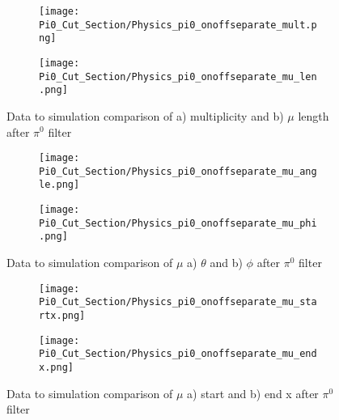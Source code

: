 \begin{figure}[h!]
\centering
  \begin{subfigure}[t]{0.3\textwidth}
    \centering
\texttt{[image: Pi0\_Cut\_Section/Physics\_pi0\_onoffseparate\_mult.png]}
  \caption{ }
  \end{subfigure} 
  \hspace{10mm}
  \begin{subfigure}[t]{0.3\textwidth}
    \centering
    \texttt{[image: Pi0\_Cut\_Section/Physics\_pi0\_onoffseparate\_mu\_len.png]}
  \caption{ }
  \end{subfigure} 
  \caption{ Data to simulation comparison of a) multiplicity and b) $\mu$ length after $\pi^0$ filter }
\label{fig:physics_pi0_mu_len}
\end{figure}

\begin{figure}[h!]
\centering
  \begin{subfigure}[t]{0.3\textwidth}
    \centering
\texttt{[image: Pi0\_Cut\_Section/Physics\_pi0\_onoffseparate\_mu\_angle.png]}
  \caption{ }
  \end{subfigure} 
  \hspace{10mm}
  \begin{subfigure}[t]{0.3\textwidth}
    \centering
\texttt{[image: Pi0\_Cut\_Section/Physics\_pi0\_onoffseparate\_mu\_phi.png]}
  \caption{ }
  \end{subfigure} 
\caption{ Data to simulation comparison of $\mu$ a) $\theta$ and b) $\phi$ after $\pi^0$ filter }

\label{fig:physics_pi0_mu_phi}
\end{figure}

\begin{figure}[t!]
\centering
  \begin{subfigure}[t]{0.3\textwidth}
    \centering
\texttt{[image: Pi0\_Cut\_Section/Physics\_pi0\_onoffseparate\_mu\_startx.png]}
  \caption{ }
  \end{subfigure} 
  \hspace{30mm}
  \begin{subfigure}[t]{0.3\textwidth}
    \centering
\texttt{[image: Pi0\_Cut\_Section/Physics\_pi0\_onoffseparate\_mu\_endx.png]}
  \caption{ }
  \end{subfigure} 
\caption{ Data to simulation comparison of $\mu$ a) start and b) end x after $\pi^0$ filter }
\label{fig:physics_pi0_mu_x}
\end{figure}

